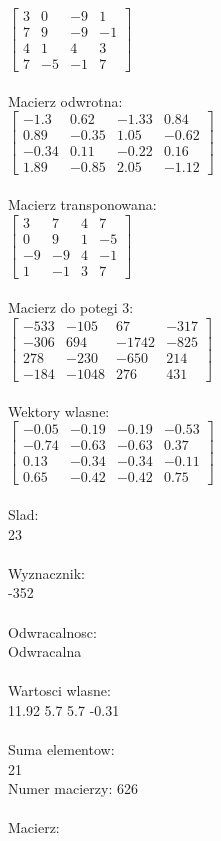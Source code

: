 \documentclass[a4paper,12pt]{article}
\begin{document}
$\begin{bmatrix} 3&0&-9&1\\7&9&-9&-1\\4&1&4&3\\7&-5&-1&7 \end{bmatrix}$
\\
\\
Macierz odwrotna:\\

$\begin{bmatrix} -1.3&0.62&-1.33&0.84\\0.89&-0.35&1.05&-0.62\\-0.34&0.11&-0.22&0.16\\1.89&-0.85&2.05&-1.12 \end{bmatrix}$
\\
\\
Macierz transponowana:\\

$\begin{bmatrix} 3&7&4&7\\0&9&1&-5\\-9&-9&4&-1\\1&-1&3&7 \end{bmatrix}$
\\
\\
Macierz do potegi 3:\\

$\begin{bmatrix} -533&-105&67&-317\\-306&694&-1742&-825\\278&-230&-650&214\\-184&-1048&276&431 \end{bmatrix}$
\\
\\
Wektory wlasne:\\

$\begin{bmatrix} -0.05&-0.19&-0.19&-0.53\\-0.74&-0.63&-0.63&0.37\\0.13&-0.34&-0.34&-0.11\\0.65&-0.42&-0.42&0.75 \end{bmatrix}$
\\
\\
Slad:\\
23
\\
\\
Wyznacznik:\\
-352
\\
\\
Odwracalnosc:\\
Odwracalna
\\
\\
Wartosci wlasne:\\
11.92 5.7 5.7 -0.31
\\
\\
Suma elementow:\\
21
\\
\newpage
Numer macierzy:
626
\\
\\
Macierz:\\
\end{document}
